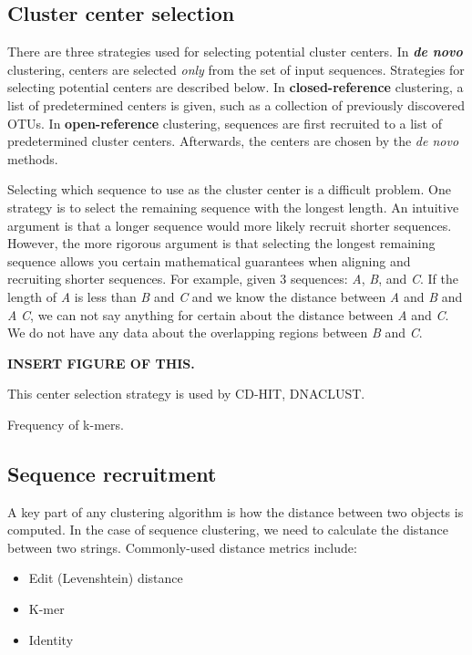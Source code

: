 \subsection{Cluster center selection}
There are three strategies used for selecting potential cluster centers.
In {\bf \emph{de novo}} clustering, centers are selected \emph{only} from the set of input sequences.  Strategies for selecting potential centers are described below.
In {\bf closed-reference} clustering, a list of predetermined centers is given, such as a collection of previously discovered OTUs\cite{desantis_greengenes_2006,quast_silva_2013}.
In {\bf open-reference} clustering, sequences are first recruited to a list of predetermined cluster centers.
Afterwards, the centers are chosen by the \emph{de novo} methods.

Selecting which sequence to use as the cluster center is a difficult problem.
One strategy is to select the remaining sequence with the longest length.
An intuitive argument is that a longer sequence would more likely recruit shorter sequences.
However, the more rigorous argument is that selecting the longest remaining sequence allows you certain mathematical guarantees when aligning and recruiting shorter sequences.
For example, given 3 sequences: \emph{A}, \emph{B}, and \emph{C}.  If the length of \emph{A} is less than \emph{B} and \emph{C} and we know the distance between \emph{A} and \emph{B} and \emph{A} \emph{C}, we can not say anything for certain about the distance between \emph{A} and \emph{C}.
We do not have any data about the overlapping regions between \emph{B} and \emph{C}.

{\bf INSERT FIGURE OF THIS.}

This center selection strategy is used by CD-HIT\cite{li_clustering_2001}, DNACLUST\cite{ghodsi_dnaclust:_2011}.

Frequency of k-mers.

\subsection{Sequence recruitment}

A key part of any clustering algorithm is how the distance between two objects is computed.
In the case of sequence clustering, we need to calculate the distance between two strings.
Commonly-used distance metrics include:

\begin{itemize}

  \item Edit (Levenshtein) distance
  \item K-mer
  \item Identity

\end{itemize}


